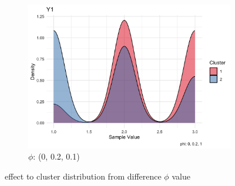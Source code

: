\documentclass{article}
\begin{document}
\begin{figure}[h]
\begin{subfigure}{0.3\textwidth}
      \centering
      \includegraphics[width=\textwidth]{images/phi_0_02_1.png}
      \caption{$\phi$: (0, 0.2, 0.1)}
  \end{subfigure}
  \caption{effect to cluster distribution from difference $\phi$ value}
  \label{fig:phi}
\end{figure}


\end{document}
